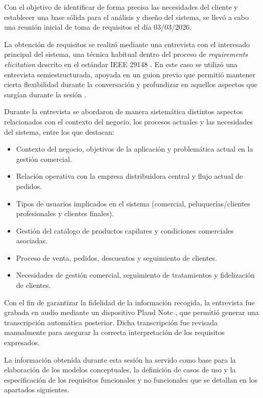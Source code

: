 Con el objetivo de identificar de forma precisa las necesidades del cliente y establecer una base sólida para el análisis y diseño del sistema, se llevó a cabo una reunión inicial de toma de requisitos el día 03/03/2026.

La obtención de requisitos se realizó mediante una entrevista con el interesado principal del sistema, una técnica habitual dentro del proceso de \textit{requirements elicitation} descrito en el estándar IEEE 29148 \citep{ieee29148}. En este caso se utilizó una entrevista semiestructurada, apoyada en un guion previo que permitió mantener cierta flexibilidad durante la conversación y profundizar en aquellos aspectos que surgían durante la sesión \citep[pp.~104--106]{sommerville}.

Durante la entrevista se abordaron de manera sistemática distintos aspectos relacionados con el contexto del negocio, los procesos actuales y las necesidades del sistema, entre los que destacan:

\begin{itemize}
    \item Contexto del negocio, objetivos de la aplicación y problemática actual en la gestión comercial.
    \item Relación operativa con la empresa distribuidora central y flujo actual de pedidos.
    \item Tipos de usuarios implicados en el sistema (comercial, peluquerías/clientes profesionales y clientes finales).
    \item Gestión del catálogo de productos capilares y condiciones comerciales asociadas.
    \item Proceso de venta, pedidos, descuentos y seguimiento de clientes.
    \item Necesidades de gestión comercial, seguimiento de tratamientos y fidelización de clientes.
\end{itemize}

Con el fin de garantizar la fidelidad de la información recogida, la entrevista fue grabada en audio mediante un dispositivo Plaud Note \citep{plaudnote}, que permitió generar una transcripción automática posterior. Dicha transcripción fue revisada manualmente para asegurar la correcta interpretación de los requisitos expresados.

La información obtenida durante esta sesión ha servido como base para la elaboración de los modelos conceptuales, la definición de casos de uso y la especificación de los requisitos funcionales y no funcionales que se detallan en los apartados siguientes.